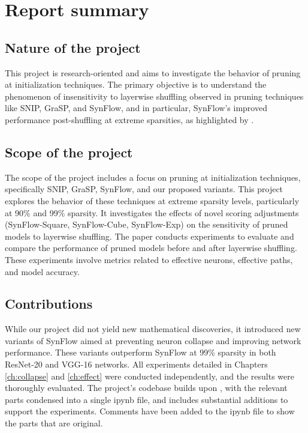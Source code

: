 \chapter*{Report summary}

\section*{Nature of the project}
This project is research-oriented and aims to investigate the behavior of pruning at initialization techniques. The primary objective is to understand the phenomenon of insensitivity to layerwise shuffling observed in pruning techniques like SNIP, GraSP, and SynFlow, and in particular, SynFlow's improved performance post-shuffling at extreme sparsities, as highlighted by \textcite{frankle21}. 

\section*{Scope of the project}
The scope of the project includes a focus on pruning at initialization techniques, specifically SNIP, GraSP, SynFlow, and our proposed variants. This project explores the behavior of these techniques at extreme sparsity levels, particularly at 90\% and 99\% sparsity. It investigates the effects of novel scoring adjustments (SynFlow-Square, SynFlow-Cube, SynFlow-Exp) on the sensitivity of pruned models to layerwise shuffling. The paper conducts experiments to evaluate and compare the performance of pruned models before and after layerwise shuffling. These experiments involve metrics related to effective neurons, effective paths, and model accuracy.

\section*{Contributions}
While our project did not yield new mathematical discoveries, it introduced new variants of SynFlow aimed at preventing neuron collapse and improving network performance. These variants outperform SynFlow at 99\% sparsity in both ResNet-20 and VGG-16 networks. All experiments detailed in Chapters \ref{ch:collapse} and \ref{ch:effect} were conducted independently, and the results were thoroughly evaluated. The project's codebase builds upon \textcite{synflow20}, with the relevant parts condensed into a single ipynb file, and includes substantial additions to support the experiments. Comments have been added to the ipynb file to show the parts that are original.

